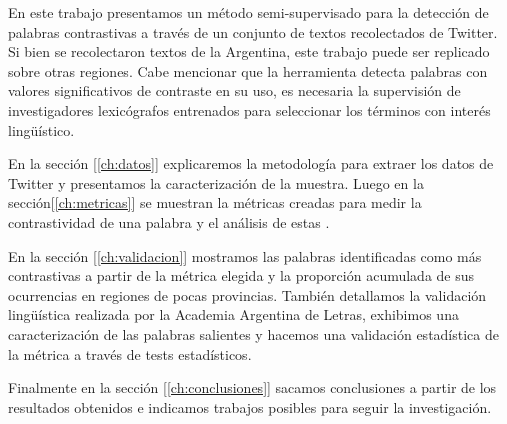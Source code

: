 
\cite{baayen2001word}



En este trabajo presentamos un método semi-supervisado para la detección de palabras contrastivas a través de un conjunto de textos recolectados de Twitter. Si bien se recolectaron textos de la Argentina, este trabajo puede ser replicado sobre otras regiones. Cabe mencionar que la herramienta detecta palabras con valores significativos de contraste en su uso, es necesaria la supervisión de investigadores lexicógrafos entrenados para seleccionar los términos con interés lingüístico.

En la sección [\ref{ch:datos}]
explicaremos la metodología para extraer los datos de Twitter y presentamos la caracterización de la muestra. Luego en la sección[\ref{ch:metricas}] se muestran la métricas creadas para medir la contrastividad de una palabra y el análisis de estas .

En la sección [\ref{ch:validacion}] mostramos las palabras identificadas como más contrastivas a partir de la métrica elegida y la proporción acumulada de sus ocurrencias en regiones de pocas provincias. 
También detallamos la validación lingüística realizada por la Academia Argentina de Letras, exhibimos una caracterización de las palabras salientes y hacemos una validación estadística de la métrica a través de tests estadísticos. 

Finalmente en la sección [\ref{ch:conclusiones}] sacamos conclusiones a partir de los resultados obtenidos e indicamos trabajos posibles para seguir la investigación.

